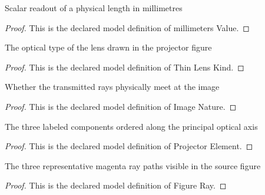 \begin{definition}
  \label{def:physics:phyx-mini-0136:phyxminiproblems-problemphyxmini0136-millimetersvalue}
  Scalar readout of a physical length in millimetres
\end{definition}
\begin{proof}
  This is the declared model definition of millimeters Value.
\end{proof}
\begin{definition}
  \label{def:physics:phyx-mini-0136:phyxminiproblems-problemphyxmini0136-thinlenskind}
  The optical type of the lens drawn in the projector figure
\end{definition}
\begin{proof}
  This is the declared model definition of Thin Lens Kind.
\end{proof}
\begin{definition}
  \label{def:physics:phyx-mini-0136:phyxminiproblems-problemphyxmini0136-imagenature}
  Whether the transmitted rays physically meet at the image
\end{definition}
\begin{proof}
  This is the declared model definition of Image Nature.
\end{proof}
\begin{definition}
  \label{def:physics:phyx-mini-0136:phyxminiproblems-problemphyxmini0136-projectorelement}
  The three labeled components ordered along the principal optical axis
\end{definition}
\begin{proof}
  This is the declared model definition of Projector Element.
\end{proof}
\begin{definition}
  \label{def:physics:phyx-mini-0136:phyxminiproblems-problemphyxmini0136-figureray}
  The three representative magenta ray paths visible in the source figure
\end{definition}
\begin{proof}
  This is the declared model definition of Figure Ray.
\end{proof}
